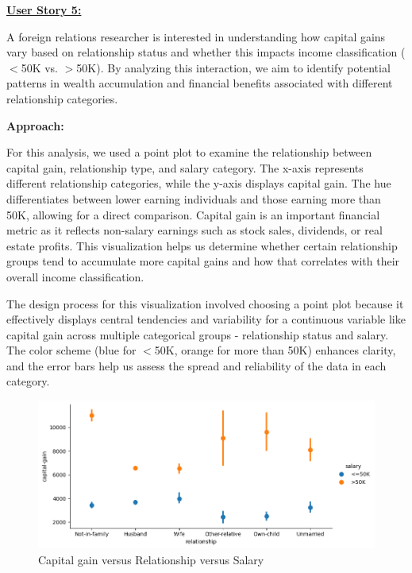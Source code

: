 \documentclass[journal,onecolumn]{IEEEtran}
\begin{document}
\medskip

\underline{\textbf{User Story 5:}}

A foreign relations researcher is interested in
understanding how capital gains vary based on relationship status
and whether this impacts income classification ($<$50K vs. $>$50K).
By analyzing this interaction, we aim to identify potential patterns
in wealth accumulation and financial benefits associated with different
relationship categories.

\textbf{Approach:} 

For this analysis, we used a point plot to examine the relationship between
capital gain, relationship type, and salary category. The x-axis represents
different relationship categories, while the y-axis displays capital gain.
The hue differentiates between lower earning individuals and those earning
more than 50K, allowing for a direct comparison. Capital gain is an important
financial metric as it reflects non-salary earnings such as stock sales,
dividends, or real estate profits. This visualization helps us determine
whether certain relationship groups tend to accumulate more capital gains
and how that correlates with their overall income classification.

The design process for this visualization involved choosing a point plot
because it effectively displays central tendencies and variability for
a continuous variable like capital gain across multiple categorical groups - 
relationship status and salary. The color scheme (blue for $<$50K, orange for more than 50K)
enhances clarity, and the error bars help us assess the spread and
reliability of the data in each category.

\begin{figure}[h]
    \centering
    \includegraphics[width=1\linewidth]{capital-gain-relationship.png}  %
    \caption{Capital gain versus Relationship versus Salary}
    \label{fig:Capital gain - Relationship - Salary}
\end{figure}
\end{document}
